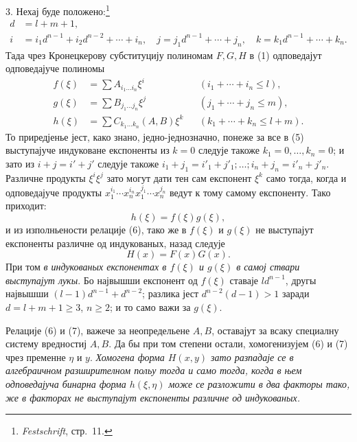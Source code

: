 ﻿\documentclass[11pt]{article}
\begin{document}
3. Нехај буде положено:\footnote{\emph{Festschrift}, стр.~11.}
\begin{equation}
\begin{aligned}
 d&=l+m+1,\\
 i&=i_1d^{n-1}+i_2d^{n-2}+\cdots+i_n,\quad
 j=j_1d^{n-1}+\cdots+j_n,\quad
 k=k_1d^{n-1}+\cdots+k_n.
\end{aligned}
\tag{4}
\end{equation}
Тада чрез Кронецкерову субституцију полиномам $F,G,H$ в (1) одповедајут одповедајуче полиномы
\begin{equation}
\begin{aligned}
 f(\xi)&=\sum A_{i_1\ldots i_n}\xi^i &&(i_1+\cdots+i_n\le l),\\
 g(\xi)&=\sum B_{j_1\ldots j_n}\xi^j &&(j_1+\cdots+j_n\le m),\\
 h(\xi)&=\sum C_{k_1\ldots k_n}(A,B)\xi^k &&(k_1+\cdots+k_n\le l+m).
\end{aligned}
\tag{5}
\end{equation}
То приредјенье јест, како знано, једно-једнозначно, понеже за все в (5) выступајуче индуковане експоненты из $k=0$ следује такоже $k_1=0,\ldots,k_n=0$; и зато из $i+j=i'+j'$ следује такоже $i_1+j_1=i'_1+j'_1;\ldots;i_n+j_n=i'_n+j'_n$. Различне продукты $\xi^i\xi^j$ зато могут дати тен сам експонент $\xi^k$ само тогда, когда и одповедајуче продукты $x_1^{i_1}\cdots x_n^{i_n}x_1^{j_1}\cdots x_n^{j_n}$ ведут к тому самому експоненту. Тако приходит:
\begin{equation}
 h(\xi)=f(\xi)g(\xi),
\tag{6}
\end{equation}
и из изполньености релације (6), тако же в $f(\xi)$ и $g(\xi)$ не выступајут експоненты различне од индукованых, назад следује
\begin{equation}
 H(x)=F(x)G(x).
\tag{7}
\end{equation}
При том \emph{в индукованых експонентах в $f(\xi)$ и $g(\xi)$ в самој ствари выступајут лукы}. Бо највышши експонент од $f(\xi)$ ставаје $ld^{n-1}$, другы највышши $(l-1)d^{n-1}+d^{n-2}$; разлика јест $d^{n-2}(d-1)>1$ заради $d=l+m+1\ge3$, $n\ge2$; и то само важи за $g(\xi)$.

Релације (6) и (7), важече за неопредельене $A,B$, оставајут за всаку специалну систему вредностиј $A,B$. Да бы при том степени остали, хомогенизујем (6) и (7) чрез пременне $\eta$ и $y$. \emph{Хомогена форма $H(x,y)$ зато разпадаје се в алгебраичном разширителном польу тогда и само тогда, когда в њем одповедајуча бинарна форма $h(\xi,\eta)$ може се разложити в два факторы тако, же в факторах не выступајут експоненты различне од индукованых.}
\end{document}
